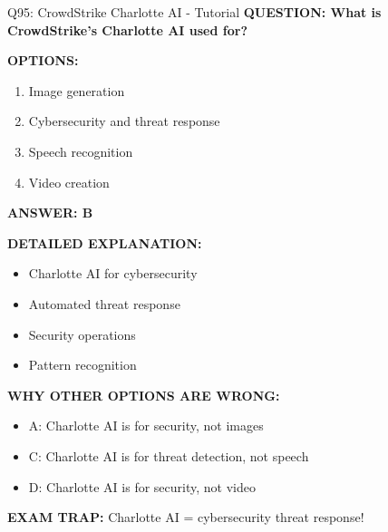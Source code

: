 \documentclass[8pt]{beamer}
\begin{document}
	\begin{frame}{Q95: CrowdStrike Charlotte AI - Tutorial}
		\fontsize{6.5}{7.5}\selectfont
		\textbf{QUESTION: What is CrowdStrike's Charlotte AI used for?}
		
		\vspace{0.1cm}
		\textbf{OPTIONS:}
		\begin{enumerate}
			\item Image generation
			\item Cybersecurity and threat response
			\item Speech recognition
			\item Video creation
		\end{enumerate}
		
		\vspace{0.1cm}
		\textcolor{myblue}{\textbf{ANSWER: B}}
		
		\vspace{0.1cm}
		\textbf{DETAILED EXPLANATION:}
		\begin{itemize}
			\item Charlotte AI for cybersecurity
			\item Automated threat response
			\item Security operations
			\item Pattern recognition
		\end{itemize}
		
		\vspace{0.1cm}
		\textcolor{myred}{\textbf{WHY OTHER OPTIONS ARE WRONG:}}
		\begin{itemize}
			\item \textcolor{myred}{A:} Charlotte AI is for security, not images
			\item \textcolor{myred}{C:} Charlotte AI is for threat detection, not speech
			\item \textcolor{myred}{D:} Charlotte AI is for security, not video
		\end{itemize}
		
		\textcolor{myred}{\textbf{EXAM TRAP:}} Charlotte AI = \textcolor{myblue}{cybersecurity threat response}!
	\end{frame}
	
\end{document}
